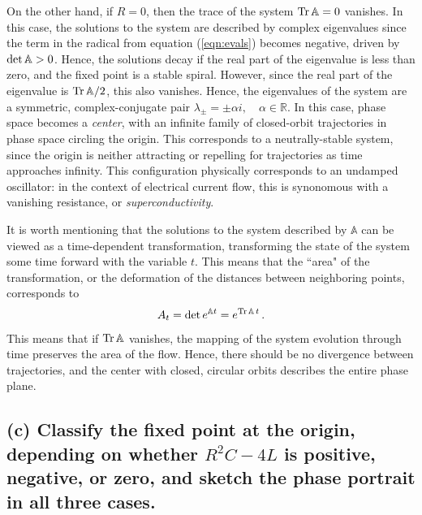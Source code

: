 \documentclass[draft]{agujournal2019}
\begin{document}
On the other hand, if $R=0$, then the trace of the system $\mathrm{Tr}\,\mathbb{A}=0$ vanishes. In this case, the solutions to the system are described by complex eigenvalues since the term in the radical from equation (\ref{eqn:evals}) becomes negative, driven by $\mathrm{det}\,\mathbb{A}>0$. Hence, the solutions decay if the real part of the eigenvalue is less than zero, and the fixed point is a stable spiral. However, since the real part of the eigenvalue is $\mathrm{Tr}\,\mathbb{A}/2$, this also vanishes. Hence, the eigenvalues of the system are a symmetric, complex-conjugate pair $\lambda_\pm = \pm\alpha i, \quad \alpha\in\mathbb{R}$. In this case, phase space becomes a \emph{center}, with an infinite family of closed-orbit trajectories in phase space circling the origin. This corresponds to a neutrally-stable system, since the origin is neither attracting or repelling for trajectories as time approaches infinity. This configuration physically corresponds to an undamped oscillator: in the context of electrical current flow, this is synonomous with a vanishing resistance, or \emph{superconductivity}.
\par

It is worth mentioning that the solutions to the system described by $\mathbb{A}$ can be viewed as a time-dependent transformation, transforming the state of the system some time forward with the variable $t$. This means that the ``area" of the transformation, or the deformation of the distances between neighboring points, corresponds to 
\begin{equation*}
    A_t = \mathrm{det}\,e^{\mathbb{A}t} = e^{\mathrm{Tr}\,\mathbb{A} \,t} \, .
\end{equation*}
This means that if $\mathrm{Tr}\,\mathbb{A}$ vanishes, the mapping of the system evolution through time preserves the area of the flow. Hence, there should be no divergence between trajectories, and the center with closed, circular orbits describes the entire phase plane. 
\par


\subsection{(c) Classify the fixed point at the origin, depending on whether $R^2C-4L$ is positive, negative, or zero, and sketch the phase portrait in all three cases. }
\label{ssec:p3c}
\end{document}

